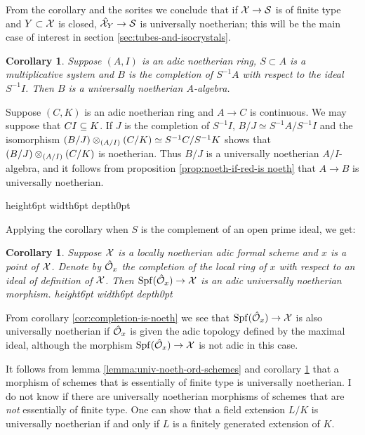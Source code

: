 \documentclass{article}
\theoremstyle{change}
\newtheorem{cor}[subsubsection]{Corollary}
\numberwithin{equation}{subsubsection}
\newcommand{\demobox}{\vrule height6pt width6pt depth0pt}
\newcommand{\nodemo}{\unskip\nobreak\hfil\qquad
\demobox\parfillskip=0pt\par}
\newenvironment{demo}{\noindent{\it Proof.}}
{{\unskip\nobreak\hfil\qquad
\demobox\parfillskip=0pt\par}
\medskip}
\newenvironment{remark}{\medskip\noindent{\textit{Remark.}}}{\medskip}
\begin{document}
From the corollary and the sorites we conclude that if ${\cal X}\to{\cal S}$ is
of finite type and $Y\subset{\cal X}$ is closed, $\hat{{\cal X}}_Y\to{\cal S}$ is
universally noetherian; this will be the main case of interest
in section \ref{sec:tubes-and-isocrystals}. 

\begin{cor}\label{cor:localization-is noeth}
  Suppose $(A,I)$ is an adic noetherian ring, $S\subset A$ is a
  multiplicative system and $B$ is the completion of $S^{-1}A$ with
  respect to the ideal $S^{-1}I$. Then $B$ is a universally noetherian
  $A$-algebra. 
\end{cor}
\begin{demo}
  Suppose $(C,K)$ is an adic noetherian ring and $A\to C$ is
  continuous. We may suppose that $CI\subseteq K$. If $J$ is the
  completion of $S^{-1}I$, $B/J\simeq S^{-1}A/S^{-1}I$ and the
  isomorphism $(B/J)\otimes_{(A/I)}(C/K)\simeq S^{-1}C/S^{-1}K$ shows
  that $(B/J)\otimes_{(A/I)}(C/K)$ is noetherian. Thus $B/J$ is a
  universally noetherian $A/I$-algebra, and it follows from
  proposition \ref{prop:noeth-if-red-is noeth} that $A\to B$ is
  universally noetherian.
\end{demo}

Applying the corollary when $S$ is the complement of an open prime
ideal, we get:

\begin{cor}\label{cor:immersion-of-complete-local-ring-is-noeth}
  Suppose ${\cal X}$ is a locally noetherian adic formal scheme and $x$ is
  a point of ${\cal X}$. Denote by $\hat{{\cal O}}_x$ the completion of the local
  ring of $x$ with respect to an ideal of definition of ${\cal X}$. Then
  ${\operatorname{Spf}({\hat{{\cal O}}_x})}\to{\cal X}$ is an adic universally noetherian morphism.
  \nodemo
\end{cor}

From corollary \ref{cor:completion-is-noeth} we see that
${\operatorname{Spf}({\hat{{\cal O}}_x})}\to{\cal X}$ is also universally noetherian if $\hat{{\cal O}}_x$ is
given the adic topology defined by the maximal ideal, although the
morphism ${\operatorname{Spf}({\hat{{\cal O}}_x})}\to{\cal X}$ is not adic in this case.

\begin{remark}
  It follows from lemma \ref{lemma:univ-noeth-ord-schemes} and
  corollary \ref{cor:immersion-of-complete-local-ring-is-noeth} that a
  morphism of schemes that is essentially of finite type is
  universally noetherian. I do not know if there are universally
  noetherian morphisms of schemes that are \textit{not} essentially of
  finite type. One can show that a field extension $L/K$ is
  universally noetherian if and only if $L$ is a finitely generated
  extension of $K$.
\end{remark}
\end{document}
